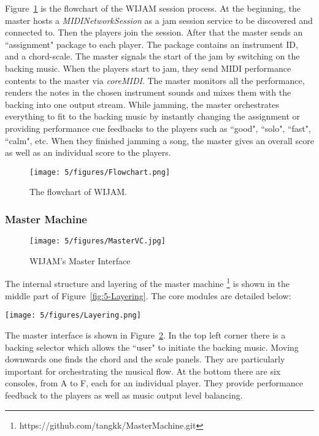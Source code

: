 Figure~\ref{fig:5-FlowChart} is the flowchart of the WIJAM session process. At the beginning, the master hosts a \textit{MIDINetworkSession} as a jam session service to be discovered and connected to. Then the players join the session. After that the master sends an ``assignment" package to each player. The package contains an instrument ID, and a chord-scale. The master signals the start of the jam by switching on the backing music. When the players start to jam, they send MIDI performance contents to the master via \textit{coreMIDI}. The master monitors all the performance, renders the notes in the chosen instrument sounds and mixes them with the backing into one output stream. While jamming, the master orchestrates everything to fit to the backing music by instantly changing the assignment or providing performance cue feedbacks to the players such as ``good", ``solo", ``fast", ``calm", etc. When they finished jamming a song, the master gives an overall score as well as an individual score to the players.
\begin{figure}[htbp]
    \centering
        \texttt{[image: 5/figures/Flowchart.png]}
    \caption{The flowchart of WIJAM.}
    \label{fig:5-FlowChart}
\end{figure}

\subsubsection{Master Machine}

\begin{figure}[htbp]
    \centering
        \texttt{[image: 5/figures/MasterVC.jpg]}
    \caption{WIJAM's Master Interface}
    \label{fig:5-MasterVC}
\end{figure}

The internal structure and layering of the master machine \footnote{https://github.com/tangkk/MasterMachine.git} is shown in the middle part
of Figure~\ref{fig:5-Layering}. The core modules are detailed below:
\begin{figure*}[htbp]
    \centering
        \texttt{[image: 5/figures/Layering.png]}
    \caption{The internal layering and structure of WIJAM. The data flows from the master machine (middle) to the player machine (right) through the bidirectional communication channel, and vice versa.}
    \label{fig:5-Layering}
\end{figure*}

The master interface is shown in Figure~\ref{fig:5-MasterVC}. In the top left corner there is a backing selector which allows the ``user" to initiate the backing music. Moving downwards one finds the chord and the scale panels. They are
particularly important for orchestrating the musical flow. At the bottom there are six consoles, from A to F, each for an individual player. They provide performance feedback to the players as well as music output level balancing.

